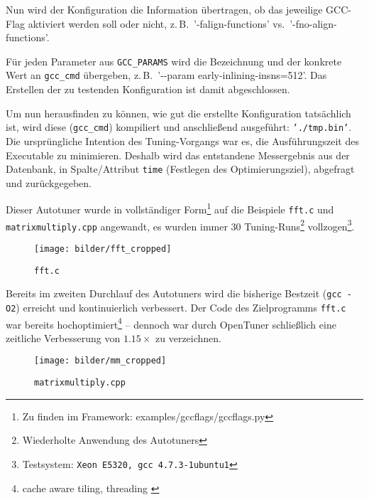 \documentclass[a4paper,11pt]{scrartcl}
\newcommand{\zB}{\mbox{z.\,B.}\xspace}
\newcommand{\vs}{\mbox{vs.}\xspace}
\begin{document}

Nun wird der Konfiguration die Information übertragen, ob das jeweilige GCC-Flag
aktiviert werden soll oder nicht, \zB~'-falign-functions' \vs~'-fno-align-functions'.


Für jeden Parameter aus \texttt{GCC\_PARAMS} wird die Bezeichnung und der
konkrete Wert an \texttt{gcc\_cmd} übergeben, \zB~'-{}-param early-inlining-insns=512'.
Das Erstellen der zu testenden Konfiguration ist damit abgeschlossen. \newline


Um nun herausfinden zu können, wie gut die erstellte Konfiguration tatsächlich ist, 
wird diese (\texttt{gcc\_cmd}) kompiliert und anschließend ausgeführt: \texttt{'./tmp.bin'}.
Die ursprüngliche Intention des Tuning-Vorgangs war es, die Ausführungszeit des 
Executable zu minimieren. Deshalb wird das entstandene Messergebnis aus der Datenbank,
in Spalte/Attribut \texttt{time} (Festlegen des Optimierungsziel), abgefragt und zurückgegeben. \newline

Dieser Autotuner wurde in vollständiger Form\footnote{Zu finden im Framework: 
examples/gccflags/gccflags.py} auf die Beispiele \texttt{fft.c} 
und \texttt{matrixmultiply.cpp} angewandt, es wurden immer 30 Tuning-Runs\footnote{Wiederholte Anwendung 
des Autotuners} vollzogen\footnote{Testsystem: \texttt{Xeon E5320, gcc 4.7.3-1ubuntu1}}.

\begin{figure}[h]
\begin{center}
\texttt{[image: bilder/fft\_cropped]}
\cite{OT-paper} \caption{\texttt{fft.c}}
\end{center}
\end{figure}

Bereits im zweiten Durchlauf des Autotuners wird die bisherige Bestzeit (\texttt{gcc -O2}) 
erreicht und kontinuierlich verbessert. Der Code des Zielprogramms \texttt{fft.c} war bereits
hochoptimiert\footnote{cache aware tiling, threading \cite[S.~6]{OT-paper}} 
-- dennoch war durch OpenTuner schließlich eine zeitliche Verbesserung von $1.15 \times$  zu verzeichnen.

\begin{figure}[h]
\begin{center}
\texttt{[image: bilder/mm\_cropped]}
\cite{OT-paper} \caption{\texttt{matrixmultiply.cpp}}
\end{center}
\end{figure}
\end{document}
